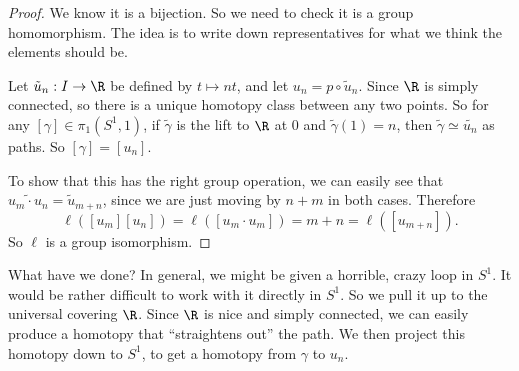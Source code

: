 \documentclass[a4paper]{article}
\begin{document}
\begin{proof}
  We know it is a bijection. So we need to check it is a group homomorphism. The idea is to write down representatives for what we think the elements should be.
  \begin{center}
  \end{center}
  Let $\tilde{u}_n: I \to \R$ be defined by $t \mapsto nt$, and let $u_n = p\circ \tilde{u}_n$. Since $\R$ is simply connected, so there is a unique homotopy class between any two points. So for any $[\gamma] \in \pi_1(S^1, 1)$, if $\tilde{\gamma}$ is the lift to $\R$ at $0$ and $\tilde{\gamma}(1) = n$, then $\tilde{\gamma} \simeq \tilde{u_n}$ as paths. So $[\gamma] = [u_n]$.

  To show that this has the right group operation, we can easily see that $\widetilde{u_m \cdot u_n} = \tilde{u}_{m + n}$, since we are just moving by $n + m$ in both cases. Therefore
  \[
    \ell([u_m][u_n]) = \ell([u_m \cdot u_m]) = m + n = \ell([u_{m + n}]).
  \]
  So $\ell$ is a group isomorphism.
\end{proof}
What have we done? In general, we might be given a horrible, crazy loop in $S^1$. It would be rather difficult to work with it directly in $S^1$. So we pull it up to the universal covering $\R$. Since $\R$ is nice and simply connected, we can easily produce a homotopy that ``straightens out'' the path. We then project this homotopy down to $S^1$, to get a homotopy from $\gamma$ to $u_n$.
\end{document}
